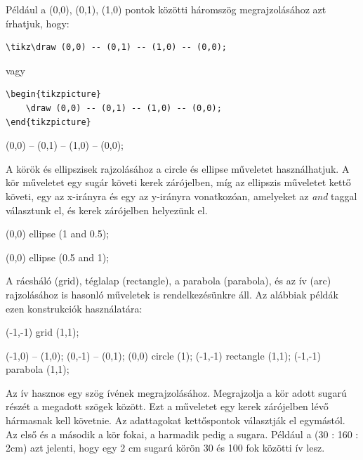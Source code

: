 \noindent
Például a (0,0), (0,1), (1,0) pontok közötti háromszög megrajzolásához azt írhatjuk, hogy:

\begin{lstlisting}[style=latex]
\tikz\draw (0,0) -- (0,1) -- (1,0) -- (0,0);
\end{lstlisting}
vagy

\begin{lstlisting}[style=latex]
\begin{tikzpicture}
	\draw (0,0) -- (0,1) -- (1,0) -- (0,0);
\end{tikzpicture}
\end{lstlisting}


\begin{tikzcode}
\draw (0,0) -- (0,1) -- (1,0) -- (0,0);
\end{tikzcode}




A körök és ellipszisek rajzolásához a circle és ellipse műveletet használhatjuk. A kör műveletet egy sugár követi kerek zárójelben, míg az ellipszis műveletet kettő követi, egy az x-irányra és egy az y-irányra vonatkozóan, amelyeket az \textit{and} taggal választunk el, és kerek zárójelben helyezünk el. 

\begin{tikzcode}
\draw (0,0) ellipse (1 and 0.5);
\end{tikzcode}

\begin{tikzcode}
\draw (0,0) ellipse (0.5 and 1);
\end{tikzcode}

\noindent
A rácsháló (grid), téglalap (rectangle), a parabola (parabola), és az ív (arc) rajzolásához is hasonló műveletek is rendelkezésünkre áll. Az alábbiak példák ezen konstrukciók használatára:

\begin{tikzcode}
\draw (-1,-1) grid (1,1);
\end{tikzcode}

\begin{tikzcode}
\draw (-1,0) -- (1,0);
\draw (0,-1) -- (0,1);
\draw (0,0) circle (1);
\draw (-1,-1) rectangle (1,1);
\draw (-1,-1) parabola (1,1);
\end{tikzcode}

\noindent
Az ív hasznos egy szög ívének megrajzolásához. Megrajzolja a kör adott sugarú részét a megadott szögek között. Ezt a műveletet egy kerek zárójelben lévő hármasnak kell követnie. Az adattagokat kettőspontok választják el egymástól. Az első és a második a kör fokai, a harmadik pedig a sugara. Például a (30 : 160 : 2cm) azt jelenti, hogy egy 2 cm sugarú körön 30 és 100 fok közötti ív lesz.

